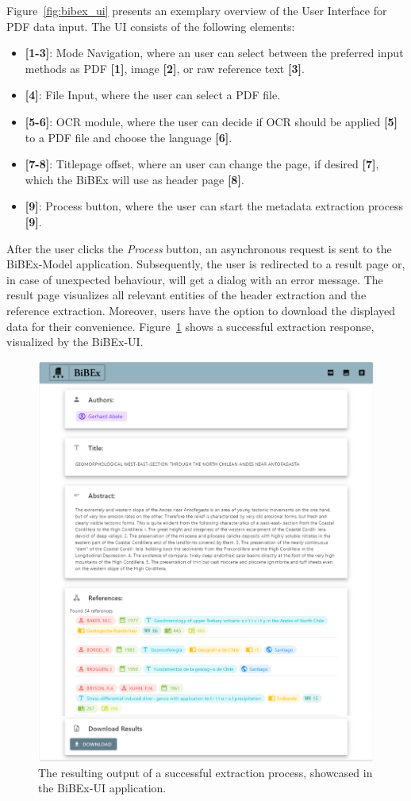 Figure~\ref{fig:bibex_ui} presents an exemplary overview of the User Interface for PDF data input. The UI consists of the following elements:
\begin{itemize}
    \item \textbf{[1-3]}: Mode Navigation, where an user can select between the preferred input methods as PDF \textbf{[1]}, image \textbf{[2]}, or raw reference text \textbf{[3]}.
    \item \textbf{[4]}: File Input, where the user can select a PDF file.
    \item \textbf{[5-6]}: OCR module, where the user can decide if OCR should be applied \textbf{[5]} to a PDF file and choose the language \textbf{[6]}.
    \item \textbf{[7-8]}: Titlepage offset, where an user can change the page, if desired \textbf{[7]}, which the BiBEx will use as header page \textbf{[8]}.
    \item \textbf{[9]}: Process button, where the user can start the metadata extraction process \textbf{[9]}.
\end{itemize}
\newpage

After the user clicks the \textit{Process} button, an asynchronous request is sent to the BiBEx-Model application. Subsequently, the user is redirected to a result page or, in case of unexpected behaviour, will get a dialog with an error message. The result page visualizes all relevant entities of the header extraction and the reference extraction. Moreover, users have the option to download the displayed data for their convenience. Figure~\ref{fig:bibex_output} shows a successful extraction response, visualized by the BiBEx-UI.

\begin{figure}[!ht]
	\centering
	\includegraphics[width=0.7\linewidth]{images/bibex_output.png}
	\caption{The resulting output of a successful extraction process, showcased in the BiBEx-UI application.}
	\label{fig:bibex_output}
\end{figure}

